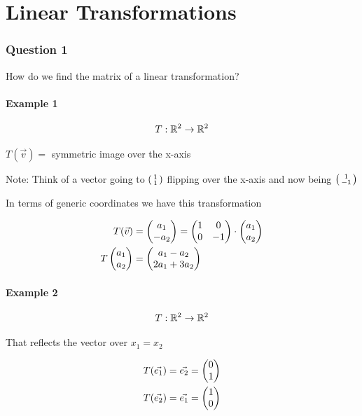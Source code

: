 \documentclass[a4paper]{article}
\begin{document}
\part*{Linear Transformations}

\section{Question 1}
How do we find the matrix of a linear transformation?

\subsection{Example 1}

\[
T:\R^2 \to \R^2 \\
\]

$T(\vec{v}) = $ symmetric image over the x-axis

Note: Think of a vector going to $\psmall{1\\1}$ flipping over the x-axis and now being $\psmall{1\\-1}$

In terms of generic coordinates we have this transformation

\[
	\begin{aligned}
		T(\vec{v}) &= \genericmat{p}{a_1\\-a_2} = \genericmat{p}{1&0\\0&-1} \cdot \genericmat{p}{a_1\\a_2} \\
		T\genericmat{p}{a_1\\a_2} &= \genericmat{p}{a_1-a_2\\2a_1+3a_2}
	\end{aligned}
\]

\subsection{Example 2}

\[T:\R^2 \to \R^2\]

That reflects the vector over $x_1 = x_2$

\[
	\begin{aligned}
		T(\vec{e_1}) &= \vec{e_2} = \genericmat{p}{0\\1} \\
		T(\vec{e_2}) &= \vec{e_1} = \genericmat{p}{1\\0} \\
	\end{aligned}
\]
\end{document}
